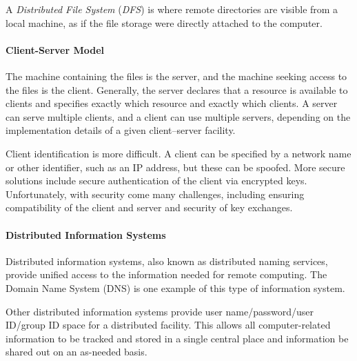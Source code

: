 \begin{definition}\label{def:Distributed_File_System}
  A \emph{Distributed File System} (\emph{DFS}) is where remote directories are visible from a local machine, as if the file storage were directly attached to the computer.
\end{definition}

\paragraph{Client-Server Model}\label{par:Client_Server_Model}
The machine containing the files is the server, and the machine seeking access to the files is the client.
Generally, the server declares that a resource is available to clients and specifies exactly which resource and exactly which clients.
A server can serve multiple clients, and a client can use multiple servers, depending on the implementation details of a given client–server facility.

Client identification is more difficult.
A client can be specified by a network name or other identifier, such as an IP address, but these can be spoofed.
More secure solutions include secure authentication of the client via encrypted keys.
Unfortunately, with security come many challenges, including ensuring compatibility of the client and server and security of key exchanges.

\paragraph{Distributed Information Systems}\label{par:Distributed_Information_Systems}
Distributed information systems, also known as distributed naming services, provide unified access to the information needed for remote computing.
The Domain Name System (DNS) is one example of this type of information system.

Other distributed information systems provide user name/password/user ID/group ID space for a distributed facility.
This allows all computer-related information to be tracked and stored in a single central place and information be shared out on an as-needed basis.

